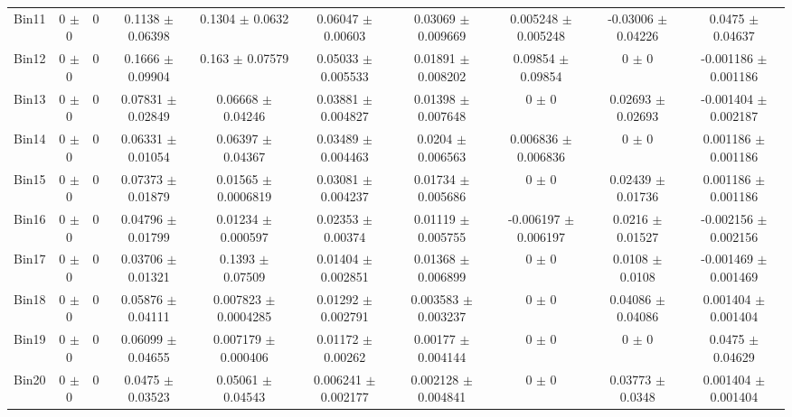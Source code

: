 \begin{tabular}{@{\extracolsep{4pt}}lccccccccc@{}}
     Bin11 & 0 $\pm$ 0 & 0 & 0.1138 $\pm$ 0.06398 & 0.1304 $\pm$ 0.0632 & 0.06047 $\pm$ 0.00603 & 0.03069 $\pm$ 0.009669 & 0.005248 $\pm$ 0.005248 & -0.03006 $\pm$ 0.04226 & 0.0475 $\pm$ 0.04637 \\ 
     Bin12 & 0 $\pm$ 0 & 0 & 0.1666 $\pm$ 0.09904 & 0.163 $\pm$ 0.07579 & 0.05033 $\pm$ 0.005533 & 0.01891 $\pm$ 0.008202 & 0.09854 $\pm$ 0.09854 & 0 $\pm$ 0 & -0.001186 $\pm$ 0.001186 \\ 
     Bin13 & 0 $\pm$ 0 & 0 & 0.07831 $\pm$ 0.02849 & 0.06668 $\pm$ 0.04246 & 0.03881 $\pm$ 0.004827 & 0.01398 $\pm$ 0.007648 & 0 $\pm$ 0 & 0.02693 $\pm$ 0.02693 & -0.001404 $\pm$ 0.002187 \\ 
     Bin14 & 0 $\pm$ 0 & 0 & 0.06331 $\pm$ 0.01054 & 0.06397 $\pm$ 0.04367 & 0.03489 $\pm$ 0.004463 & 0.0204 $\pm$ 0.006563 & 0.006836 $\pm$ 0.006836 & 0 $\pm$ 0 & 0.001186 $\pm$ 0.001186 \\ 
     Bin15 & 0 $\pm$ 0 & 0 & 0.07373 $\pm$ 0.01879 & 0.01565 $\pm$ 0.0006819 & 0.03081 $\pm$ 0.004237 & 0.01734 $\pm$ 0.005686 & 0 $\pm$ 0 & 0.02439 $\pm$ 0.01736 & 0.001186 $\pm$ 0.001186 \\ 
     Bin16 & 0 $\pm$ 0 & 0 & 0.04796 $\pm$ 0.01799 & 0.01234 $\pm$ 0.000597 & 0.02353 $\pm$ 0.00374 & 0.01119 $\pm$ 0.005755 & -0.006197 $\pm$ 0.006197 & 0.0216 $\pm$ 0.01527 & -0.002156 $\pm$ 0.002156 \\ 
     Bin17 & 0 $\pm$ 0 & 0 & 0.03706 $\pm$ 0.01321 & 0.1393 $\pm$ 0.07509 & 0.01404 $\pm$ 0.002851 & 0.01368 $\pm$ 0.006899 & 0 $\pm$ 0 & 0.0108 $\pm$ 0.0108 & -0.001469 $\pm$ 0.001469 \\ 
     Bin18 & 0 $\pm$ 0 & 0 & 0.05876 $\pm$ 0.04111 & 0.007823 $\pm$ 0.0004285 & 0.01292 $\pm$ 0.002791 & 0.003583 $\pm$ 0.003237 & 0 $\pm$ 0 & 0.04086 $\pm$ 0.04086 & 0.001404 $\pm$ 0.001404 \\ 
     Bin19 & 0 $\pm$ 0 & 0 & 0.06099 $\pm$ 0.04655 & 0.007179 $\pm$ 0.000406 & 0.01172 $\pm$ 0.00262 & 0.00177 $\pm$ 0.004144 & 0 $\pm$ 0 & 0 $\pm$ 0 & 0.0475 $\pm$ 0.04629 \\ 
     Bin20 & 0 $\pm$ 0 & 0 & 0.0475 $\pm$ 0.03523 & 0.05061 $\pm$ 0.04543 & 0.006241 $\pm$ 0.002177 & 0.002128 $\pm$ 0.004841 & 0 $\pm$ 0 & 0.03773 $\pm$ 0.0348 & 0.001404 $\pm$ 0.001404 \\ 
\hline\hline
  \end{tabular}

